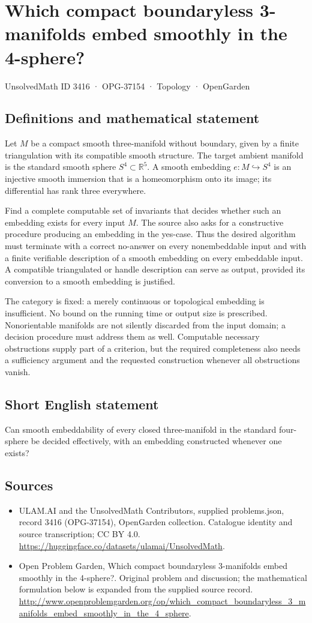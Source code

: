 \documentclass[11pt,a4paper]{article}
\begin{document}
\section*{Which compact boundaryless 3-manifolds embed smoothly in the 4-sphere?}\label{3416}
{\small UnsolvedMath ID 3416 · OPG-37154 · Topology · OpenGarden}
\subsection{Definitions and mathematical statement}
Let $M$ be a compact smooth three-manifold without boundary, given
by a finite triangulation with its compatible smooth structure.
The target ambient manifold is the standard smooth sphere
$S^4\subset\mathbb R^5$. A smooth embedding $e:M\hookrightarrow S^4$
is an injective smooth immersion that is a homeomorphism onto its
image; its differential has rank three everywhere.

Find a complete computable set of invariants that decides whether
such an embedding exists for every input $M$. The source also asks
for a constructive procedure producing an embedding in the yes-case.
Thus the desired algorithm must terminate with a correct no-answer
on every nonembeddable input and with a finite verifiable description
of a smooth embedding on every embeddable input. A compatible
triangulated or handle description can serve as output, provided
its conversion to a smooth embedding is justified.

The category is fixed: a merely continuous or topological embedding
is insufficient. No bound on the running time or output size is
prescribed. Nonorientable manifolds are not silently discarded from
the input domain; a decision procedure must address them as well.
Computable necessary obstructions supply part of a criterion, but
the required completeness also needs a sufficiency argument and
the requested construction whenever all obstructions vanish.
\subsection{Short English statement}
Can smooth embeddability of every closed three-manifold in the standard four-sphere be decided effectively, with an embedding constructed whenever one exists?
\subsection{Sources}
\begin{itemize}
\item[S1] ULAM.AI and the UnsolvedMath Contributors, supplied problems.json, record 3416 (OPG-37154), OpenGarden collection. Catalogue identity and source transcription; CC BY 4.0.
\url{https://huggingface.co/datasets/ulamai/UnsolvedMath}.
\item[S2] Open Problem Garden, Which compact boundaryless 3-manifolds embed smoothly in the 4-sphere?. Original problem and discussion; the mathematical formulation below is expanded from the supplied source record.
\url{http://www.openproblemgarden.org/op/which_compact_boundaryless_3_manifolds_embed_smoothly_in_the_4_sphere}.
\end{itemize}
\end{document}
